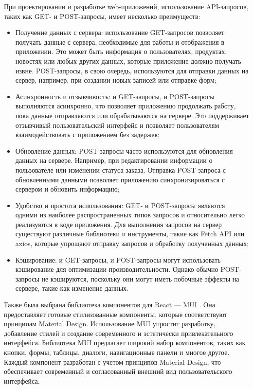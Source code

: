 При проектировании и разработке web-приложений, использование API-запросов, таких как GET- и POST-запросы, имеет несколько преимуществ:
\begin{itemize}
    \item Получение данных с сервера: использование GET-запросов позволяет получать данные с сервера, необходимые для работы и отображения в приложении. Это может быть информация о пользователях, продуктах, новостях или любых других данных, которые приложение должно получать извне. POST-запросы, в свою очередь, используются для отправки данных на сервер, например, при создании новых записей или отправке форм;
    \item Асинхронность и отзывчивость: и GET-запросы, и POST-запросы выполняются асинхронно, что позволяет приложению продолжать работу, пока данные отправляются или обрабатываются на сервере. Это поддерживает отзывчивый пользовательский интерфейс и позволяет пользователям взаимодействовать с приложением без задержек;
    \item Обновление данных: POST-запросы часто используются для обновления данных на сервере. Например, при редактировании информации о пользователе или изменении статуса заказа. Отправка POST-запроса с обновленными данными позволяет приложению синхронизироваться с сервером и обновить информацию;
    \item Удобство и простота использования: GET- и POST-запросы являются одними из наиболее распространенных типов запросов и относительно легко реализуются в коде приложения. Для выполнения запросов на сервер существуют различные библиотеки и инструменты, такие как Fetch API или axios, которые упрощают отправку запросов и обработку полученных данных;
    \item Кэширование: и GET-запросы, и POST-запросы могут использовать кэширование для оптимизации производительности. Однако обычно POST-запросы не кэшируются, поскольку они могут иметь побочные эффекты на сервере, такие как изменение данных.
\end{itemize}

Также была выбрана библиотека компонентов для React — MUI \cite{MUI}. Она предоставляет готовые стилизованные компоненты, которые соответствуют принципам Material Design. Использование MUI упростит разработку, добавление стилей и создание современного и эстетически привлекательного интерфейса.  Библиотека MUI предлагает широкий набор компонентов, таких как кнопки, формы, таблицы, диалоги, навигационные панели и многое другое. Каждый компонент разработан с учетом принципов Material Design, что обеспечивает современный и согласованный внешний вид пользовательского интерфейса.

